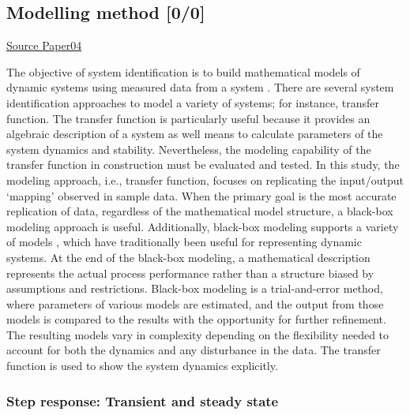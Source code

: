 \documentclass{article}
\begin{document}
\subsection{Modelling method [0/0]}
\label{sec:org2ba7f89}
\uline{Source Paper04}

The objective of system identification is to build mathematical models of dynamic systems using measured data from a system \citep{Ljung1999}.
There are several system identification approaches to model a variety of systems; for instance, transfer function.
The transfer function is particularly useful because it provides an algebraic description of a system as well means to calculate parameters of the system dynamics and stability.
Nevertheless, the modeling capability of the transfer function in construction must be evaluated and tested.
In this study, the modeling approach, i.e., transfer function, focuses on replicating the input/output `mapping' observed in sample data.
When the primary goal is the most accurate replication of data, regardless of the mathematical model structure, a black-box modeling approach is useful.
Additionally, black-box modeling supports a variety of models \citep{Bapat2011, Billings2013}, which have traditionally been useful for representing dynamic systems.
At the end of the black-box modeling, a mathematical description represents the actual process performance rather than a structure biased by assumptions and restrictions.
Black-box modeling is a trial-and-error method, where parameters of various models are estimated, and the output from those models is compared to the results with the opportunity for further refinement.
The resulting models vary in complexity depending on the flexibility needed to account for both the dynamics and any disturbance in the data.
The transfer function is used to show the system dynamics explicitly.

\subsubsection{Step response: Transient and steady state}
\label{sec:org54f1ad0}
\end{document}
